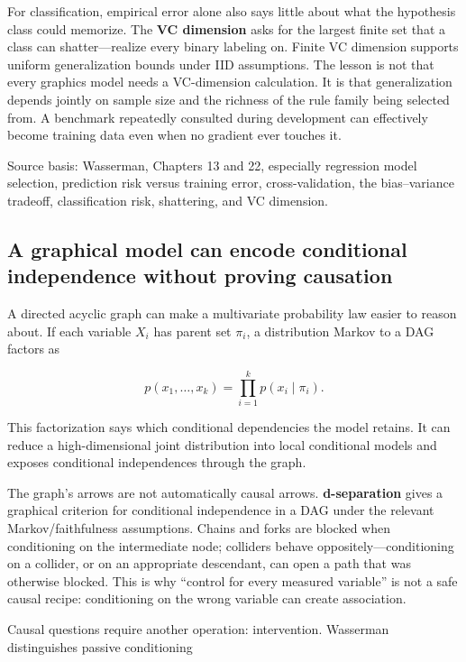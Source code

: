 For classification, empirical error alone also says little about what the hypothesis class could memorize. The \textbf{VC dimension} asks for the largest finite set that a class can shatter---realize every binary labeling on. Finite VC dimension supports uniform generalization bounds under IID assumptions. The lesson is not that every graphics model needs a VC-dimension calculation. It is that generalization depends jointly on sample size and the richness of the rule family being selected from. A benchmark repeatedly consulted during development can effectively become training data even when no gradient ever touches it.

Source basis: Wasserman, Chapters 13 and 22, especially regression model selection, prediction risk versus training error, cross-validation, the bias--variance tradeoff, classification risk, shattering, and VC dimension.

\subsection{A graphical model can encode conditional independence without proving causation}\label{02-foundations-ii-ch030-a-graphical-model-can-encode-conditional-independence-without-proving-causation}

A directed acyclic graph can make a multivariate probability law easier to reason about. If each variable \(X_i\) has parent set \(\pi_i\), a distribution Markov to a DAG factors as

\[
p(x_1,\ldots,x_k)
=
\prod_{i=1}^{k}
p(x_i\mid \pi_i).
\]

This factorization says which conditional dependencies the model retains. It can reduce a high-dimensional joint distribution into local conditional models and exposes conditional independences through the graph.

The graph's arrows are not automatically causal arrows. \textbf{d-separation} gives a graphical criterion for conditional independence in a DAG under the relevant Markov/faithfulness assumptions. Chains and forks are blocked when conditioning on the intermediate node; colliders behave oppositely---conditioning on a collider, or on an appropriate descendant, can open a path that was otherwise blocked. This is why ``control for every measured variable'' is not a safe causal recipe: conditioning on the wrong variable can create association.

Causal questions require another operation: intervention. Wasserman distinguishes passive conditioning

